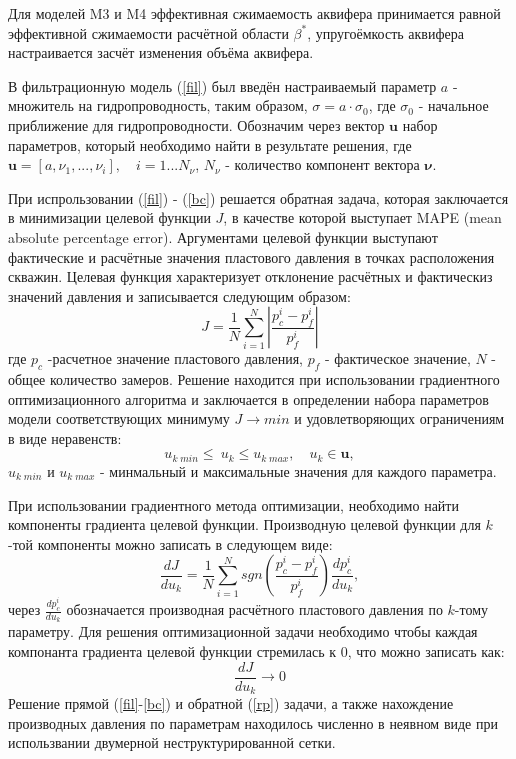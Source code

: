 \documentclass{article}
\begin{document}
Для моделей M3 и M4 эффективная сжимаемость аквифера принимается равной эффективной сжимаемости расчётной области $\beta^*$, упругоёмкость аквифера настраивается засчёт изменения объёма аквифера.

В фильтрационную модель (\ref{fil}) был введён настраиваемый параметр $a$ - множитель на гидропроводность, таким образом, $\sigma = a\cdot\sigma_0$, где $\sigma_0$ - начальное приближение для гидропроводности. Обозначим через вектор $\boldsymbol{u}$ набор параметров, который необходимо найти в результате решения, где $\boldsymbol{u} = [a, \nu_{1},...,\nu_{i}],\quad i = 1...N_{\nu}$, $N_{\nu}$ - количество компонент вектора $\boldsymbol{\nu}$.

При испрользовании (\ref{fil}) - (\ref{bc}) решается обратная задача, которая заключается в  минимизации целевой функции $J$, в качестве которой выступает MAPE (mean absolute percentage error). Аргументами целевой функции выступают фактические и расчётные значения пластового давления в точках расположения скважин. Целевая функция характеризует отклонение расчётных и фактическиз значений давления и записывается следующим образом:
\begin{equation} \label{mape}
J=\frac{1}{N}\sum_{i=1}^N{\left\vert\frac{p_c^i-p_f^i}{p_f^i}\right\vert}
\end{equation}
где $p_c$ -расчетное значение пластового давления, $p_f$ - фактическое значение, $N$ - общее количество замеров. Решение находится при использовании градиентного оптимизационного алгоритма и заключается в определении набора параметров модели соответствующих минимуму $J \rightarrow min$ и удовлетворяющих ограничениям в виде неравенств:
\begin{equation*}
u_{k\;min}\leq\ u_k\leq u_{k\;max}, \quad u_k \in \boldsymbol{u},
\end{equation*}
$u_{k\;min}$ и $u_{k\;max}$ - минмальный и максимальные значения для каждого параметра.

При использовании градиентного метода оптимизации, необходимо найти компоненты градиента целевой функции. Производную целевой функции для $k$-той компоненты можно записать в следующем виде:
\begin{equation}
\frac{dJ}{du_k} = \frac{1}{N}\sum_{i=1}^N sgn\left(\frac{p_c^i-p_f^i}{p_f^i}\right)\frac{dp_c^i}{du_k},
\end{equation}
через $\frac{dp_c^i}{du_k}$ обозначается производная расчётного пластового давления по $k$-тому параметру. Для решения оптимизационной задачи необходимо чтобы каждая компонанта градиента целевой функции стремилась к 0, что можно записать как:
\begin{equation} \label{rp}
	 \frac{dJ}{du_k} \rightarrow 0
\end{equation}
Решение прямой (\ref{fil}-\ref{bc}) и обратной (\ref{rp}) задачи, а также нахождение производных давления по параметрам находилось численно \cite{opt} в неявном виде при использвании двумерной неструктурированной сетки.
\end{document}

